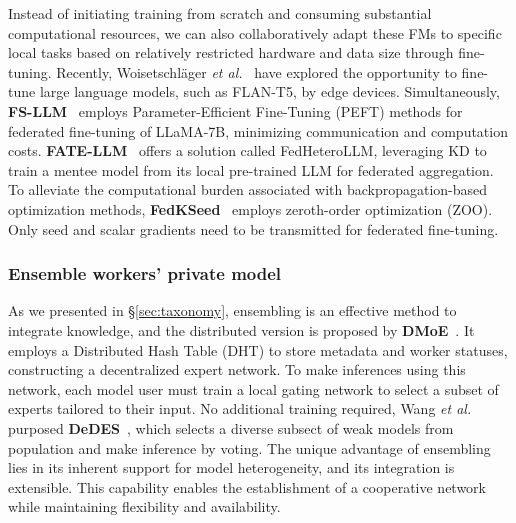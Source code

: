 Instead of initiating training from scratch and consuming substantial computational resources, we can also collaboratively adapt these FMs to specific local tasks based on relatively restricted hardware and data size through fine-tuning.
Recently, Woisetschl{\"a}ger \textit{et al.}~\cite{woisetschlager2023federated} have explored the opportunity to fine-tune large language models, such as FLAN-T5, by edge devices.
Simultaneously, \textbf{FS-LLM}~\cite{kuang2023federatedscope} employs Parameter-Efficient Fine-Tuning (PEFT) methods for federated fine-tuning of LLaMA-7B, minimizing communication and computation costs.
\textbf{FATE-LLM}~\cite{fan2023fate} offers a solution called FedHeteroLLM, leveraging KD to train a mentee model from its local pre-trained LLM for federated aggregation.
To alleviate the computational burden associated with backpropagation-based optimization methods, \textbf{FedKSeed}~\cite{qin2023federated} employs zeroth-order optimization (ZOO). 
Only seed and scalar gradients need to be transmitted for federated fine-tuning.

\subsubsection{Ensemble workers' private model} %
As we presented in \S\ref{sec:taxonomy}, ensembling is an effective method to integrate knowledge, and the distributed version is proposed by \textbf{DMoE}~\cite{ryabinin2020towards}. 
It employs a Distributed Hash Table (DHT) to store metadata and worker statuses, constructing a decentralized expert network. 
To make inferences using this network, each model user must train a local gating network to select a subset of experts tailored to their input.
No additional training required, Wang \textit{et al.} purposed \textbf{DeDES}~\cite{wang2023data}, which selects a diverse subsect of weak models from population and make inference by voting. 
The unique advantage of ensembling lies in its inherent support for model heterogeneity, and its integration is extensible. 
This capability enables the establishment of a cooperative network while maintaining flexibility and availability.


